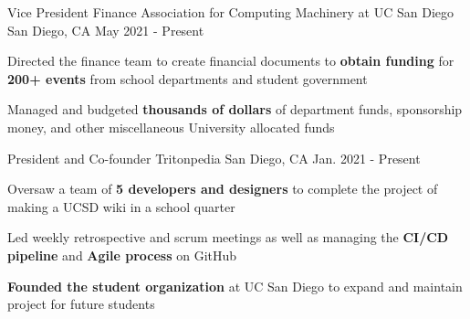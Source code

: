 \begin{cventries}

\cventry
{Vice President Finance}
{Association for Computing Machinery at UC San Diego}
{San Diego, CA}
{May 2021 - Present}
{
\begin{cvitems}
  \item Directed the finance team to create financial documents to \textbf{obtain funding} for \textbf{200+ events} from school departments and student government
  \item Managed and budgeted \textbf{thousands of dollars} of department funds, sponsorship money, and other miscellaneous University allocated funds
\end{cvitems}
}

\cventry
{President and Co-founder}
{Tritonpedia}
{San Diego, CA}
{Jan. 2021 - Present}
{
\begin{cvitems}
  \item Oversaw a team of \textbf{5 developers and designers} to complete the project of making a UCSD wiki in a school quarter
  \item Led weekly retrospective and scrum meetings as well as managing the \textbf{CI/CD pipeline} and \textbf{Agile process} on GitHub
  \item \textbf{Founded the student organization} at UC San Diego to expand and maintain project for future students
\end{cvitems}
}
\end{cventries}